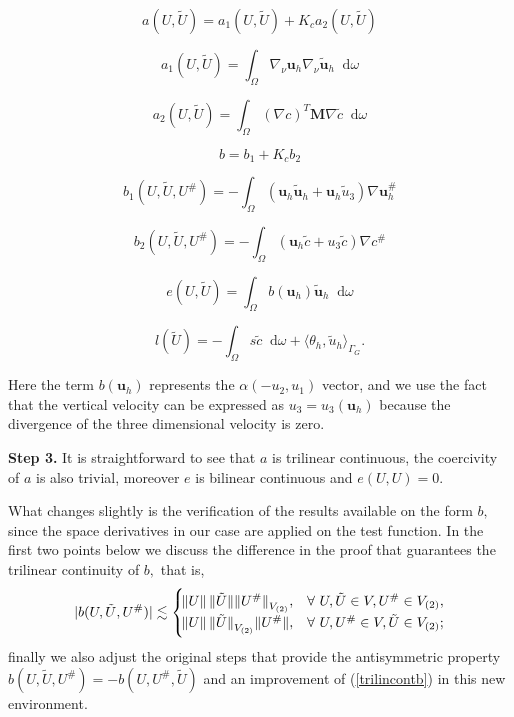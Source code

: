 \documentclass[12pt]{report}
\numberwithin{theorem}{chapter}
\numberwithin{corollary}{chapter}
\numberwithin{lemma}{chapter}
\numberwithin{remark}{chapter}
\numberwithin{definition}{chapter}
\numberwithin{prop}{chapter}
\newcommand*\diff{\mathop{}\!\mathrm{d}}
\begin{document}
\[ a(U,\tilde{U}) = a_1 (U, \tilde{U}) + K_c a_2 (U, \tilde{U})\]

\[ a_1 (U, \tilde{U}) = \int_\Omega \nabla_\nu \mathbf{u}_h \nabla_\nu \mathbf{\tilde{u}}_h \diff \omega \]

\[ a_2 (U, \tilde{U}) = \int_\Omega (\nabla c)^T \mathbf{M} \nabla \tilde{c} \diff \omega \]

\[ b = b_1 + K_c b_2\]

\[ b_1 (U, \tilde{U}, U^\#) = - \int_\Omega (\mathbf{u}_h \mathbf{\tilde{u}}_h + \mathbf{u}_h \tilde{u}_3) \nabla \mathbf{u}_h^\# \]

\[ b_2 (U, \tilde{U}, U^\#) = -  \int_\Omega (\mathbf{u}_h \tilde{c} + u_3 \tilde{c}) \nabla c^\# \]

\[ e(U, \tilde{U}) = \int_\Omega b(\mathbf{u}_h) \mathbf{\tilde{u}}_h \diff \omega \]

\[ l(\tilde{U}) = - \int_\Omega s \tilde{c} \diff \omega + \langle \theta_h, \tilde{u}_h \rangle _{\Gamma_G}. \]

Here the term $b(\mathbf{u}_h)$ represents the $\alpha (-u_2, u_1)$ vector, and we use the fact that the vertical velocity can be expressed as $u_3 = u_3(\mathbf{u}_h)$ because the divergence of the three dimensional velocity is zero.

\textbf{Step 3.} It is straightforward to see that $a$ is trilinear continuous, the coercivity of $a$ is also trivial, moreover $e$ is bilinear continuous and $e(U,U) = 0$.

What changes slightly is the verification of the results available on the form $b,$ since the space derivatives in our case are applied on the test function. In the first two points below we discuss the difference in the proof that guarantees the trilinear continuity of $b,$ that is,
%
\begin{equation} \label{trilincontb}
  \lvert b(U, \tilde{U}, U^\# ) \rvert \lesssim \begin{cases}
    \norm{U} \|\tilde{U} \|  {\| U^\#  \|}_{V_{(2)}}, & \forall \text{ } U, \tilde{U} \in V, U^\# \in V_{(2)}, \\
    \norm{U} { \|\tilde{U} \|}_{V_{(2)}} \| U^\# \|, & \forall \text{ } U, U^\# \in V, \tilde{U}  \in V_{(2)};
  \end{cases}
\end{equation}
%
finally we also adjust the original steps that provide the antisymmetric property $b(U, \tilde{U}, U^\# ) = - b(U, U^\#, \tilde{U} )$ and an improvement of (\ref{trilincontb}) in this new environment.
\end{document}
